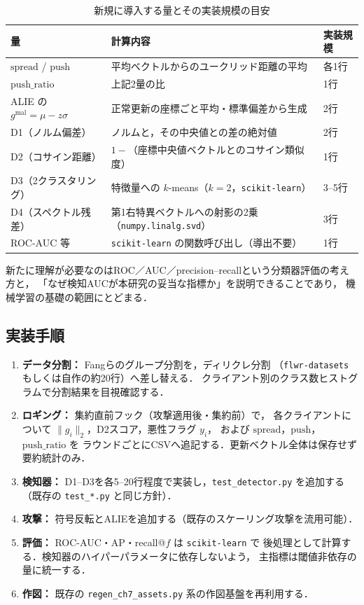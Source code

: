 \documentclass[a4j, dvipdfmx]{jsarticle}  %
\begin{document}
\begin{table}[H]
\centering
\caption{新規に導入する量とその実装規模の目安}
\begin{tabular}{@{}P{4.4cm} P{6.6cm} P{3.6cm}@{}}
\toprule
量 & 計算内容 & 実装規模 \\
\midrule
$\mathrm{spread}$ / $\mathrm{push}$ & 平均ベクトルからのユークリッド距離の平均 & 各1行 \\
$\mathrm{push\_ratio}$ & 上記2量の比 & 1行 \\
ALIE の $g^{\text{mal}} = \mu - z\sigma$ & 正常更新の座標ごと平均・標準偏差から生成 & 2行 \\
D1（ノルム偏差） & ノルムと，その中央値との差の絶対値 & 2行 \\
D2（コサイン距離） & $1-$（座標中央値ベクトルとのコサイン類似度） & 1行 \\
D3（2クラスタリング） & 特徴量への $k$-means（$k=2$，\texttt{scikit-learn}） & 3--5行 \\
D4（スペクトル残差） & 第1右特異ベクトルへの射影の2乗（\texttt{numpy.linalg.svd}） & 3行 \\
ROC-AUC 等 & \texttt{scikit-learn} の関数呼び出し（導出不要） & 1行 \\
\bottomrule
\end{tabular}
\end{table}

\noindent
新たに理解が必要なのはROC／AUC／precision--recallという分類器評価の考え方と，
「なぜ検知AUCが本研究の妥当な指標か」を説明できることであり，
機械学習の基礎の範囲にとどまる．

\subsection{実装手順}

\begin{enumerate}
  \item \textbf{データ分割：} Fangらのグループ分割を，ディリクレ分割
        （\texttt{flwr-datasets} もしくは自作の約20行）へ差し替える．
        クライアント別のクラス数ヒストグラムで分割結果を目視確認する．
  \item \textbf{ロギング：} 集約直前フック（攻撃適用後・集約前）で，
        各クライアントについて $\|g_i\|_2$，D2スコア，悪性フラグ $y_i$，
        および $\mathrm{spread}$，$\mathrm{push}$，$\mathrm{push\_ratio}$ を
        ラウンドごとにCSVへ追記する．更新ベクトル全体は保存せず要約統計のみ．
  \item \textbf{検知器：} D1--D3を各5--20行程度で実装し，\texttt{test\_detector.py} を追加する
        （既存の \texttt{test\_*.py} と同じ方針）．
  \item \textbf{攻撃：} 符号反転とALIEを追加する（既存のスケーリング攻撃を流用可能）．
  \item \textbf{評価：} ROC-AUC・AP・recall@$f$ は \texttt{scikit-learn} で
        後処理として計算する．検知器のハイパーパラメータに依存しないよう，
        主指標は閾値非依存の量に統一する．
  \item \textbf{作図：} 既存の \texttt{regen\_ch7\_assets.py} 系の作図基盤を再利用する．
\end{enumerate}
\end{document}
